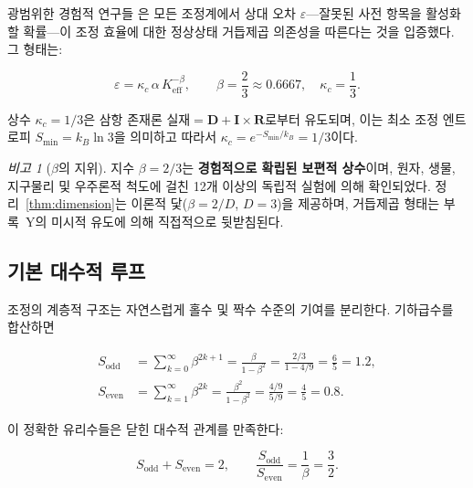 \documentclass[12pt,a4paper]{article}
\theoremstyle{remark}
\newtheorem{remark}[theorem]{비고}
\begin{document}
	광범위한 경험적 연구들 \cite{AppendixL, AppendixFerra}은 모든 조정계에서 상대 오차 \(\varepsilon\)—잘못된 사전 항목을 활성화할 확률—이 조정 효율에 대한 정상상태 거듭제곱 의존성을 따른다는 것을 입증했다. 그 형태는:
	
	\begin{equation}
		\boxed{\varepsilon = \kappa_c \, \alpha \, K_{\mathrm{eff}}^{-\beta}, \qquad
			\beta = \frac{2}{3} \approx 0.6667,\quad \kappa_c = \frac{1}{3}}.
		\label{eq:error-law-corrected}
	\end{equation}
	
	상수 \(\kappa_c = 1/3\)은 삼항 존재론 \(\text{실재} = \mathbf{D} + \mathbf{I} \times \mathbf{R}\)로부터 유도되며, 이는 최소 조정 엔트로피 \(S_{\min} = k_B \ln 3\)을 의미하고 따라서 \(\kappa_c = e^{-S_{\min}/k_B} = 1/3\)이다.
	
	\begin{remark}[\(\beta\)의 지위]
		지수 \(\beta = 2/3\)는 \textbf{경험적으로 확립된 보편적 상수}이며, 원자, 생물, 지구물리 및 우주론적 척도에 걸친 12개 이상의 독립적 실험에 의해 확인되었다. 정리~\ref{thm:dimension}는 이론적 닻(\(\beta = 2/D\), \(D=3\))을 제공하며, 거듭제곱 형태는 부록~Y의 미시적 유도에 의해 직접적으로 뒷받침된다.
	\end{remark}
	
	\subsection{기본 대수적 루프}
	\label{sec:algebraic-loop}
	
	조정의 계층적 구조는 자연스럽게 홀수 및 짝수 수준의 기여를 분리한다. 기하급수를 합산하면
	
	\begin{align}
		S_{\mathrm{odd}} &= \sum_{k=0}^{\infty} \beta^{2k+1} = \frac{\beta}{1-\beta^{2}}
		= \frac{2/3}{1 - 4/9} = \frac{6}{5} = 1.2, \label{eq:sodd}\\
		S_{\mathrm{even}} &= \sum_{k=1}^{\infty} \beta^{2k} = \frac{\beta^{2}}{1-\beta^{2}}
		= \frac{4/9}{5/9} = \frac{4}{5} = 0.8. \label{eq:seven}
	\end{align}
	
	이 정확한 유리수들은 닫힌 대수적 관계를 만족한다:
	
	\begin{equation}
		\boxed{S_{\mathrm{odd}} + S_{\mathrm{even}} = 2, \qquad
			\frac{S_{\mathrm{odd}}}{S_{\mathrm{even}}} = \frac{1}{\beta} = \frac{3}{2}}.
		\label{eq:algebraic-loop}
	\end{equation}
	
\end{document}
